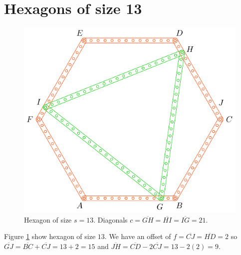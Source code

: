 \documentclass[11pt]{article}
\begin{document}
\section{Hexagons of size 13}

\begin{figure}[H]
\centering
\includegraphics[scale=1]{13/hexa-13a}
\caption{Hexagon of size $s = 13$. Diagonals $c = \overline{GH} = \overline{HI} = \overline{IG} = 21$.}
\label{fig:13a}
\end{figure}

Figure \ref{fig:13a} show hexagon of size $13$. We have an offset of $f = \overline{CJ} = \overline{HD} = 2$ so $\overline{GJ} = \overline{BC} + \overline{CJ} = 13+2 = 15$ and $\overline{JH} = \overline{CD} - 2\overline{CJ} = 13 - 2(2) = 9$.
\end{document}
